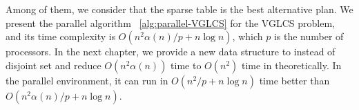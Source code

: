 Among of them, we consider that the sparse table is the best alternative plan.  We present the parallel algorithm ~\ref{alg:parallel-VGLCS} for the VGLCS problem, and its time complexity is $O(n^2 \alpha(n) / p + n \log n)$, which $p$ is the number of processors. In the next chapter, we provide a new data structure to instead of disjoint set and reduce $O(n^2 \alpha(n))$ time to $O(n^2)$ time in theoretically.  In the parallel environment, it can run in $O(n^2 /p + n \log n)$ time better than $O(n^2 \alpha(n)/p + n \log n)$.

